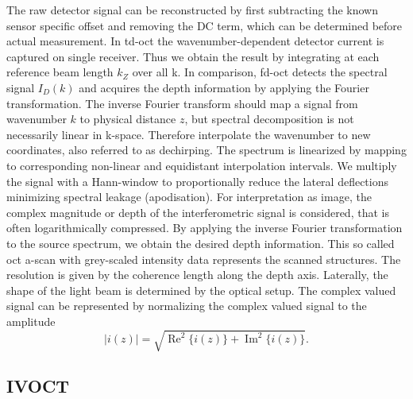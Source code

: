 The raw detector signal can be reconstructed by first subtracting the known sensor specific offset and removing the DC term, which can be determined before actual measurement. In \acrshort{td-oct} the wavenumber-dependent detector current is captured on single receiver. Thus we obtain the result by integrating at each reference beam length \( k_Z \) over all k. In comparison, \acrshort{fd-oct} detects the spectral signal  \( I_D(k) \) and acquires the depth information by applying the Fourier transformation. The inverse Fourier transform should map a signal from wavenumber \( k \) to physical distance \( z \), but spectral decomposition is not necessarily linear in k-space. Therefore interpolate the wavenumber to new coordinates, also referred to as dechirping. The spectrum is linearized by mapping to corresponding non-linear and equidistant \gls{interpolation} intervals. We multiply the signal with a Hann-window to proportionally reduce the lateral deflections minimizing spectral leakage (apodisation). For interpretation as image, the complex magnitude or depth of the interferometric signal is considered, that is often logarithmically compressed. By applying the inverse Fourier transformation to the source spectrum, we obtain the desired depth information. This so called \acrshort{oct} \Gls{a-scan} with grey-scaled intensity data represents the scanned structures. The resolution is given by the coherence length along the depth axis. Laterally, the shape of the light beam is determined by the optical setup. The complex valued signal can be represented by normalizing the complex valued signal to the amplitude
\begin{equation}
\left| i(z) \right| = \sqrt{\operatorname{Re}^{2}\{i(z)\}+\operatorname{Im}^{2}\{i(z)\}}.
\end{equation}

\subsection{IVOCT}

